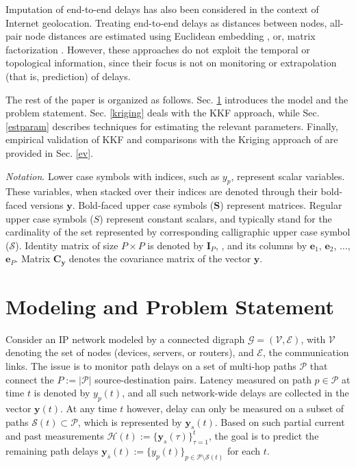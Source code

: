 \documentclass[draftcls,onecolumn,12pt]{IEEEtran}
\providecommand{\abs}[1]{\lvert#1\rvert}												\renewcommand{\b}[1]{\ensuremath{\mathbf{#1}}}		 							\newcommand{\bs}[1]{\ensuremath{\boldsymbol{#1}}}		 						\renewcommand{\c}[1]{\ensuremath{\mathcal{#1}}} 								\newcommand{\E}[1]{\ensuremath{\mathbb{E}\left[#1\right]}} 		  \newcommand{\Es}[1]{\ensuremath{\mathbb{E}^{*}\left[#1\right]}} \newcommand{\ind}{1\hspace{-1.6mm}1}														\newcommand{\norm}[1]{\ensuremath{\left\|#1\right\|}}						\newcommand{\tb}[1]{\ensuremath{\tilde{\mathbf{#1}}}}		 				\newcommand{\mat}[1]{\ensuremath{\begin{bmatrix}#1\end{bmatrix}}}
\def \ypt {{y_p(t)}}
\def \P {{\c{P}}}
\theoremstyle{plain}\newtheorem{thm}{Theorem}
\theoremstyle{definition}
\theoremstyle{remark}
\begin{document}
Imputation of end-to-end delays has also been considered in the context of Internet geolocation. 
Treating end-to-end delays as distances between nodes, all-pair node distances are estimated using Euclidean embedding \cite{vivaldi}, or, matrix factorization \cite{fact11}. 
However, these approaches do not exploit the temporal or topological information, since their focus is not on monitoring or extrapolation (that is, prediction) of delays.

The rest of the paper is organized as follows. Sec. \ref{probstat} introduces the model and the problem statement. Sec. \ref{kriging} deals with the KKF approach, while Sec. \ref{estparam} describes techniques for estimating the relevant parameters. 
Finally, empirical validation of KKF and comparisons with the Kriging approach of \cite{nk} 
are provided in Sec. \ref{ev}.  



\emph{Notation}. Lower case symbols with indices, such as $y_p$, represent scalar variables. These variables, when stacked over their indices are denoted through their bold-faced versions $\b{y}$. Bold-faced upper case symbols ($\b{S}$) represent matrices. Regular upper case symbols ($S$) represent constant scalars, and typically stand for the cardinality of the set represented by corresponding calligraphic upper case symbol ($\c{S}$). Identity matrix of size $P \times P$ is denoted by $\b{I}_P$, , and its columns by $\b{e}_1$, $\b{e}_2$, $\ldots$, $\b{e}_P$. Matrix $\b{C}_{\b{y}}$ denotes the covariance matrix of the vector $\b{y}$. 

\section{Modeling and Problem Statement} \label{probstat}



Consider an IP network modeled by a connected digraph $\c{G} = (\c{V},\c{E})$, with $\c{V}$ denoting the set of nodes (devices, servers, or routers), and $\c{E}$, the communication links.
The issue is to monitor path delays on a set of multi-hop paths $\P$ that connect the $P:=\abs{\P}$ source-destination pairs. 
Latency measured on path $p \in \P$ at time $t$ is denoted by $\ypt$, and all such network-wide delays are collected in the vector $\b{y}(t)$.
At any time $t$ however, delay can only be measured on a subset of paths $\c{S}(t)\subset \P$, which is represented by $\b{y}_{s}(t)$.
Based on such partial current and past measurements $\c{H}(t) := \{\b{y}_{s}(\tau)\}_{\tau=1}^t$, the goal is to predict the remaining path delays $\b{y}_{\bar{s}}(t):= \{\ypt\}_{p\in \P\setminus\c{S}(t)}$ for each $t$.
\end{document}
